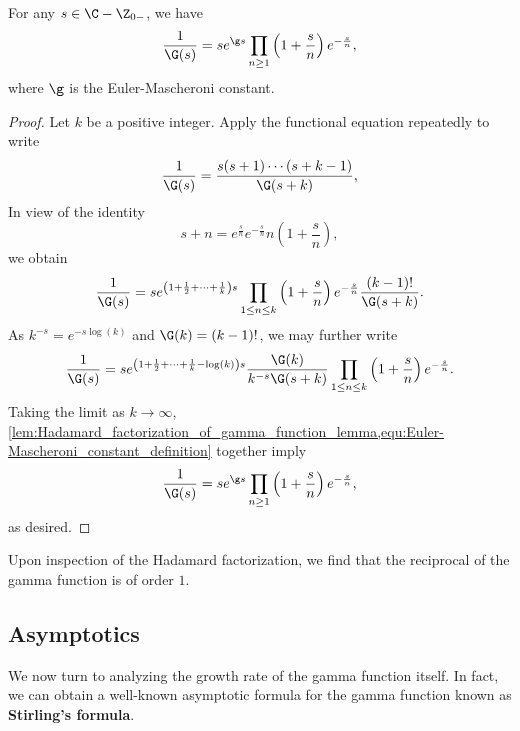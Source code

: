\documentclass[12pt]{article}
\begin{document}
      \begin{theorem}\label{thm:Hadamard_factorization_for_reciprocal_of_gamma}
        For any \(s \in \C-\Z_{0-}\), we have
        \[
          \frac{1}{\G(s)} = se^{\g s}\prod_{n \ge 1}\left(1+\frac{s}{n}\right)e^{-\frac{s}{n}},
        \]
        where \(\g\) is the Euler-Mascheroni constant.
      \end{theorem}
      \begin{proof}
        Let \(k\) be a positive integer. Apply the functional equation repeatedly to write
        \[
          \frac{1}{\G(s)} = \frac{s(s+1) \cdots (s+k-1)}{\G(s+k)},
        \]
        In view of the identity
        \[
          s+n = e^{\frac{s}{n}}e^{-\frac{s}{n}}n\left(1+\frac{s}{n}\right),
        \]
        we obtain
        \[
          \frac{1}{\G(s)} = se^{\left(1+\frac{1}{2}+\cdots+\frac{1}{k}\right)s}\prod_{1 \le n \le k}\left(1+\frac{s}{n}\right)e^{-\frac{s}{n}}\frac{(k-1)!}{\G(s+k)}.
        \]
        As \(k^{-s}= e^{-s\log(k)}\) and \(\G(k) = (k-1)!\), we may further write
        \[
          \frac{1}{\G(s)} = se^{\left(1+\frac{1}{2}+\cdots+\frac{1}{k}-\log(k)\right)s}\frac{\G(k)}{k^{-s}\G(s+k)}\prod_{1 \le n \le k}\left(1+\frac{s}{n}\right)e^{-\frac{s}{n}}.
        \]
        Taking the limit as \(k \to \infty\), \cref{lem:Hadamard_factorization_of_gamma_function_lemma,equ:Euler-Mascheroni_constant_definition} together imply
        \[
          \frac{1}{\G(s)} = se^{\g s}\prod_{n \ge 1}\left(1+\frac{s}{n}\right)e^{-\frac{s}{n}},
        \]
        as desired.
      \end{proof}

      Upon inspection of the Hadamard factorization, we find that the reciprocal of the gamma function is of order \(1\).
    \subsection{Asymptotics}
      We now turn to analyzing the growth rate of the gamma function itself. In fact, we can obtain a well-known asymptotic formula for the gamma function known as \textbf{Stirling's formula}.
\end{document}
